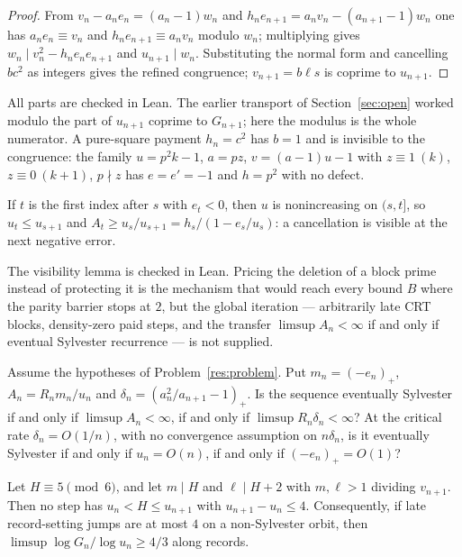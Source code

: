 \begin{proof}
From $v_n-a_ne_n=(a_n-1)w_n$ and $h_ne_{n+1}=a_nv_n-(a_{n+1}-1)w_n$ one has
$a_ne_n\equiv v_n$ and $h_ne_{n+1}\equiv a_nv_n$ modulo $w_n$; multiplying
gives $w_n\mid v_n^2-h_ne_ne_{n+1}$ and $u_{n+1}\mid w_n$.  Substituting the
normal form and cancelling $bc^2$ as integers gives the refined congruence;
$v_{n+1}=b\ell s$ is coprime to $u_{n+1}$.
\end{proof}

All parts are checked in Lean.  The earlier transport of
Section~\ref{sec:open} worked modulo the part of $u_{n+1}$ coprime to
$G_{n+1}$; here the modulus is the whole numerator.  A pure-square payment
$h_n=c^2$ has $b=1$ and is invisible to the congruence: the family
$u=p^2k-1$, $a=pz$, $v=(a-1)u-1$ with $z\equiv1\ (k)$, $z\equiv0\ (k+1)$,
$p\nmid z$ has $e=e'=-1$ and $h=p^2$ with no defect.

\begin{lemma}\label{res:amplified}
If $t$ is the first index after $s$ with $e_t<0$, then $u$ is nonincreasing on
$(s,t]$, so $u_t\le u_{s+1}$ and
$A_t\ge u_s/u_{s+1}=h_s/(1-e_s/u_s)$: a cancellation is visible at the next
negative error.
\end{lemma}

The visibility lemma is checked in Lean.  Pricing the deletion of a block
prime instead of protecting it is the mechanism that would reach every bound
$B$ where the parity barrier stops at $2$, but the global iteration ---
arbitrarily late CRT blocks, density-zero paid steps, and the transfer
$\limsup A_n<\infty$ if and only if eventual Sylvester recurrence --- is not
supplied.

\begin{problem}\label{res:amplifiedglobal}
Assume the hypotheses of Problem~\ref{res:problem}.  Put $m_n=(-e_n)_+$,
$A_n=R_nm_n/u_n$ and $\delta_n=(a_n^2/a_{n+1}-1)_+$.  Is the sequence
eventually Sylvester if and only if $\limsup A_n<\infty$, if and only if
$\limsup R_n\delta_n<\infty$?  At the critical rate $\delta_n=O(1/n)$, with no
convergence assumption on $n\delta_n$, is it eventually Sylvester if and only
if $u_n=O(n)$, if and only if $(-e_n)_+=O(1)$?
\end{problem}

\begin{theorem}\label{res:twomodulus}
Let $H\equiv5\pmod6$, and let $m\mid H$ and $\ell\mid H+2$ with $m,\ell>1$
dividing $v_{n+1}$.  Then no step has $u_n<H\le u_{n+1}$ with
$u_{n+1}-u_n\le4$.  Consequently, if late record-setting jumps are at most $4$
on a non-Sylvester orbit, then $\limsup\log G_n/\log u_n\ge4/3$ along records.
\end{theorem}


